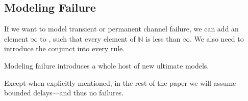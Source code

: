 \subsection{Modeling Failure}
\label{sec:failure}

If we want \lang to model transient or permanent channel failure, we can add an element $\infty$ to , such that every element of $\mathbb{N}$ is less than $\infty$.  We also need to introduce the conjunct  into every \lang rule.

Modeling failure introduces a whole host of new ultimate models. 

Except when explicitly mentioned, in the rest of the paper we will assume bounded delays---and thus no failures.


